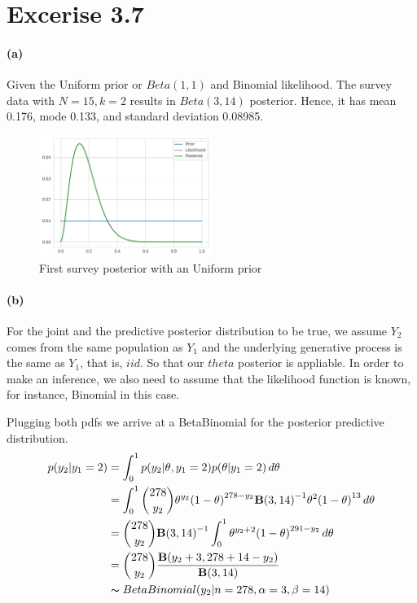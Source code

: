 \documentclass[11pt, letterpaper]{article}
\begin{document}
\section{Excerise 3.7}
\paragraph{(a)}
Given the Uniform prior or $Beta(1, 1)$ and Binomial likelihood. The survey data with $N = 15, k = 2$ results in
$Beta(3, 14)$ posterior. Hence, it has mean 0.176, mode 0.133, and standard deviation 0.08985.

\begin{figure}[h]
    \captionsetup{justification=centering, margin=2cm}
    \centering
    \includegraphics[width=0.5\textwidth]{hw2_3.7.png}
    \caption{First survey posterior with an Uniform prior}
\end{figure}

\paragraph{(b)}
For the joint and the predictive posterior distribution to be true, we assume $Y_2$ comes from the same population
as $Y_1$ and the underlying generative process is the same as $Y_1$, that is, $iid$. So that our $theta$ posterior
is appliable. In order to make an inference, we also need to assume that the likelihood function is known,
for instance, Binomial in this case.

Plugging both pdfs we arrive at a BetaBinomial for the posterior predictive distribution.
\begin{align*}
    p(y_2|y_1=2) &= \int_0^1{p(y_2|\theta, y_1=2)p(\theta|y_1=2)} \, d\theta  \\
      &= \int_0^1 \binom{278}{y_2} \theta^{y_2} {(1-\theta)}^{278-y_2} {\mathbf{B}(3, 14)}^{-1}\theta^2{(1-\theta)}^{13} \, d\theta \\
      &= \binom{278}{y_2} {\mathbf{B}(3, 14)}^{-1} \int_0^1 \theta^{y_2+2} {(1-\theta)}^{291-y_2} \, d\theta \\
      &= \binom{278}{y_2} \frac{\mathbf{B}(y_2+3, 278+14-y_2)}{\mathbf{B}(3, 14)} \\
      &\thicksim BetaBinomial(y_2 | n=278, \alpha = 3, \beta = 14)
\end{align*}
\end{document}
